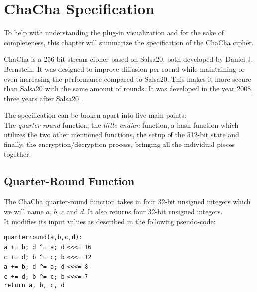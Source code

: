 
\chapter{ChaCha Specification}
\label{chap:chacha}

To help with understanding the plug-in visualization and for the sake of completeness, this chapter will summarize the specification of the ChaCha cipher.

ChaCha is a 256-bit stream cipher based on Salsa20, both developed by Daniel J. Bernstein. It was designed to improve diffusion per round while maintaining or even increasing the performance compared to Salsa20. This makes it more secure than Salsa20 with the same amount of rounds. It was developed in the year 2008, three years after Salsa20 \cite{chachaspec}.

The specification can be broken apart into five main points: \\
The \textit{quarter-round} function, the \textit{little-endian} function, a hash function which utilizes the two other mentioned functions, the setup of the 512-bit state and finally, the encryption/decryption process, bringing all the individual pieces together.

\section{Quarter-Round Function}
\label{sec:chacha.qr}

The ChaCha quarter-round function takes in four 32-bit unsigned integers which we will name $a$, $b$, $c$ and $d$. It also returns four 32-bit unsigned integers.\\
It modifies its input values as described in the following pseudo-code:

\begin{center}
\begin{minipage}{0.5\linewidth}
\texttt{quarterround(a,b,c,d):} \\
\hspace*{2em}\texttt{a += b; d  \^{}= a; d} \verb|<<<|\texttt{= 16} \\
\hspace*{2em}\texttt{c += d; b \^{}= c; b} \verb|<<<|\texttt{= 12} \\
\hspace*{2em}\texttt{a += b; d \^{}= a; d} \verb|<<<|\texttt{= 8} \\
\hspace*{2em}\texttt{c += d; b \^{}= c; b} \verb|<<<|\texttt{= 7} \\
\hspace*{2em}\texttt{return a, b, c, d}
\end{minipage}
\end{center}

